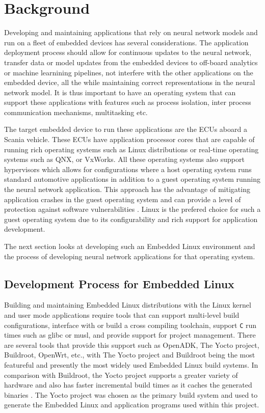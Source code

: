 
\chapter{Background}

Developing and maintaining applications that rely on neural network models and run on a fleet of embedded devices has several considerations. The application deployment process should allow for continuous updates to the neural network, transfer data or model updates from the embedded devices to off-board analytics or machine learnining pipelines, not interfere with the other applications on the embedded device, all the while maintaining correct representations in the neural network model. It is thus important to have an operating system that can support these applications with features such as process isolation, inter process communication mechanisms, multitasking etc.

The target embedded device to run these applications are the ECUs aboard a Scania vehicle. These ECUs have application processor cores that are capable of running rich operating systems such as Linux distributions or real-time operating systems such as QNX, or VxWorks. All these operating systems also support hypervisors which allows for configurations where a host operating system runs standard automotive applications in addition to a guest operating system running the neural network application. This approach has the advantage of mitigating application crashes in the guest operating system and can provide a level of protection against software vulnerabilities \cite{Linux-guest-os}. Linux is the prefered choice for such a guest operating system due to its configurability and rich support for application development.

The next section looks at developing such an Embedded Linux environment and the process of developing neural network applications for that operating system.

\section{Development Process for Embedded Linux}

Building and maintaining Embedded Linux distributions with the Linux kernel and user mode applications require tools that can support multi-level build configurations, interface with or build a cross compiling toolchain, support \texttt{C} run times such as glibc or musl, and provide support for project management. There are several tools that provide this support such as OpenADK, The Yocto project, Buildroot, OpenWrt, etc., with The Yocto project and Buildroot being the most featureful and presently the most widely used Embedded Linux build systems. In comparison with Buildroot, the Yocto project supports a greater variety of hardware and also has faster incremental build times as it caches the generated binaries \cite{yocto}. The Yocto project was chosen as the primary build system and used to generate the Embedded Linux and application programs used within this project.

